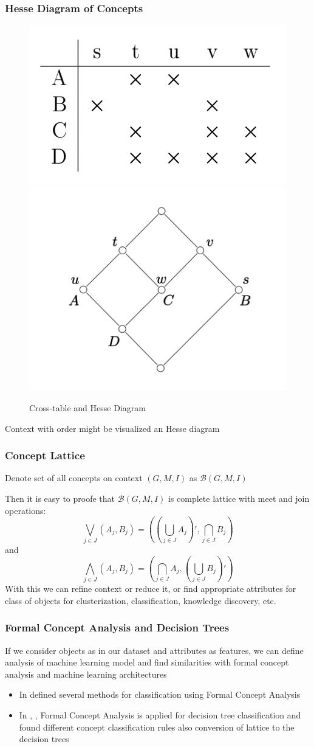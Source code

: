 \documentclass{beamer}
\newcommand {\B}                          {\mathcal{B}}
\begin{document}
\begin{frame}
    \frametitle{Hesse Diagram of Concepts}
    \begin{figure}
        \centering
        \includegraphics[width=0.4\linewidth]{cross_table_2.png} 
        \includegraphics[width=0.4\linewidth]{hesse_diagram_1.png}
        \caption{Cross-table and Hesse Diagram}
        \label{fig:cross_table_hesse_diag}
    \end{figure}
        
    Context with order might be visualized an Hesse diagram
\end{frame}

\begin{frame}
    \frametitle{Concept Lattice}
    Denote set of all concepts on context $(G, M, I)$ as $\B(G, M, I)$

    Then it is easy to proofe that $\B(G, M, I)$ is complete lattice with meet and join
    operations:
    $$
    \bigvee_{j \in J}{(A_j, B_j)} = ((\bigcup_{j \in J}{A_j})', \bigcap_{j \in J}{B_j})
    $$
    and
    $$
    \bigwedge_{j \in J}{(A_j, B_j)} = (\bigcap_{j \in J}{A_j}, (\bigcup_{j \in J}{B_j})')
    $$
    With this we can refine context or reduce it, 
    or find appropriate attributes for class of objects for clusterization, classification, 
    knowledge discovery, etc.
\end{frame}

\begin{frame}
    \frametitle{Formal Concept Analysis and Decision Trees}
    If we consider objects as in our dataset and attributes as features, we can define
    analysis of machine learning model and find similarities with formal concept analysis
    and machine learning architectures
    \begin{itemize}
        \item In \cite{ClassFCA} defined several methods for classification using 
        Formal Concept Analysis
        \item In \cite{DesTreeLatt}, \cite{DesRFCL}, \cite{LattClassTree} Formal Concept Analysis
        is applied for decision tree classification and found different concept classification rules
        also conversion of lattice to the decision trees
    \end{itemize}
\end{frame}
\end{document}
